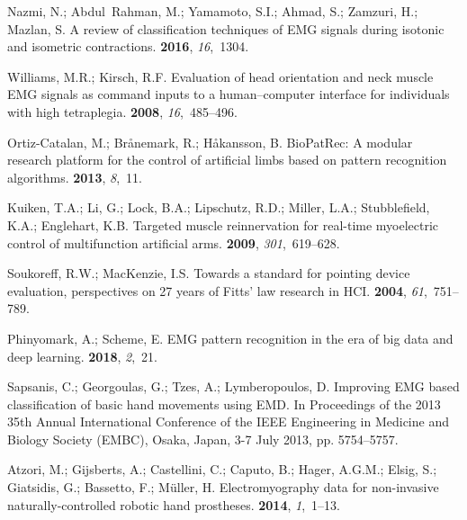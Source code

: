 \documentclass[sensors,review,accept,moreauthors,pdftex]{Definitions/mdpi}
\begin{document}
\begin{thebibliography}{999}
Nazmi, N.; Abdul~Rahman, M.; Yamamoto, S.I.; Ahmad, S.; Zamzuri, H.; Mazlan, S.
\newblock A review of classification techniques of EMG signals during isotonic
  and isometric contractions.
 {\bf 2016}, {\em 16},~1304.

Williams, M.R.; Kirsch, R.F.
\newblock Evaluation of head orientation and neck muscle EMG signals as command
  inputs to a human--computer interface for individuals with high tetraplegia.
 {\bf 2008}, {\em 16},~485--496.

Ortiz-Catalan, M.; Br{\aa}nemark, R.; H{\aa}kansson, B.
\newblock BioPatRec: A modular research platform for the control of artificial
  limbs based on pattern recognition algorithms.
 {\bf 2013}, {\em 8},~11.

Kuiken, T.A.; Li, G.; Lock, B.A.; Lipschutz, R.D.; Miller, L.A.; Stubblefield,
  K.A.; Englehart, K.B.
\newblock Targeted muscle reinnervation for real-time myoelectric control of
  multifunction artificial arms.
 {\bf 2009}, {\em 301},~619--628.

Soukoreff, R.W.; MacKenzie, I.S.
\newblock Towards a standard for pointing device evaluation, perspectives on 27
  years of Fitts’ law research in HCI.
 {\bf 2004},
  {\em 61},~751--789.

Phinyomark, A.; Scheme, E.
\newblock EMG pattern recognition in the era of big data and deep learning.
 {\bf 2018}, {\em 2},~21.

Sapsanis, C.; Georgoulas, G.; Tzes, A.; Lymberopoulos, D.
\newblock Improving EMG based classification of basic hand movements using EMD.
In {Proceedings of the }  2013 35th Annual International Conference of the IEEE Engineering in Medicine and Biology Society (EMBC), Osaka, Japan, 3-7 July 2013, pp. 5754--5757.

Atzori, M.; Gijsberts, A.; Castellini, C.; Caputo, B.; Hager, A.G.M.; Elsig,
  S.; Giatsidis, G.; Bassetto, F.; M{\"u}ller, H.
\newblock Electromyography data for non-invasive naturally-controlled robotic
  hand prostheses.
 {\bf 2014}, {\em 1},~1--13.

\end{thebibliography}




\end{document}

